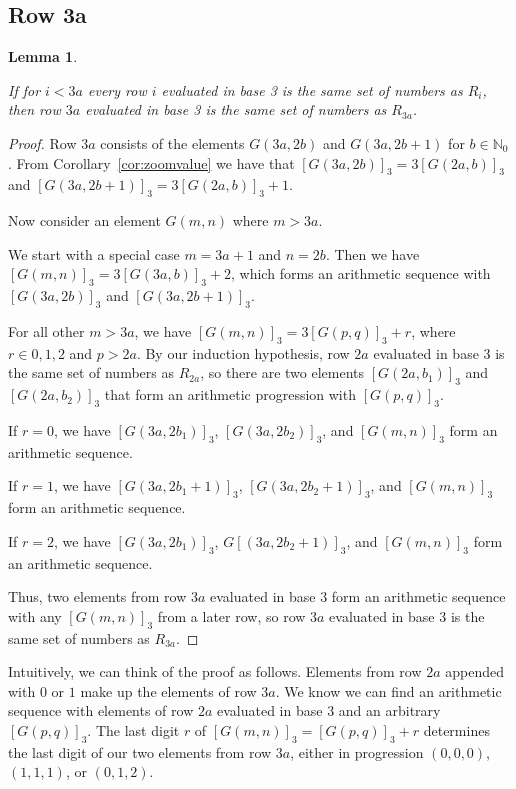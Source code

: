 \documentclass[12pt,reqno]{article}
\theoremstyle{plain}
\newtheorem{lemma}[theorem]{Lemma}
\theoremstyle{definition}
\theoremstyle{remark}
\begin{document}
\subsection{Row 3a}

\begin{lemma}\label{lemma:3a}

If for $i < 3a$ every row $i$ evaluated in base 3 is the same set of numbers as $R_i$, then row $3a$ evaluated in base 3 is the same set of numbers as $R_{3a}$.
\end{lemma}
\begin{proof}
Row $3a$ consists of the elements $G(3a,2b)$ and $G(3a,2b+1)$ for $b \in \mathbb{N}_0$. From Corollary~\ref{cor:zoomvalue} we have that $[G(3a,2b)]_3 = 3[G(2a,b)]_3$ and $[G(3a,2b+1)]_3 = 3[G(2a,b)]_3+1$. 

Now consider an element $G(m,n)$ where $m>3a$. 

We start with a special case $m= 3a+1$ and $n = 2b$. Then we have $[G(m,n)]_3 = 3[G(3a,b)]_3+2$, which forms an arithmetic sequence with $[G(3a,2b)]_3$ and $[G(3a,2b+1)]_3$. 

For all other $m>3a$, we have $[G(m,n)]_3 = 3[G(p,q)]_3 + r$, where $r \in {0,1,2}$ and $p>2a$. By our induction hypothesis, row $2a$ evaluated in base 3 is the same set of numbers as $R_{2a}$, so there are two elements $[G(2a,b_1)]_3$ and $[G(2a,b_2)]_3$ that form an arithmetic progression with $[G(p,q)]_3$.

If $r = 0$, we have $[G(3a,2b_1)]_3$, $[G(3a,2b_2)]_3$, and $[G(m,n)]_3$ form an arithmetic sequence.

If $r = 1$, we have $[G(3a,2b_1+1)]_3$, $[G(3a,2b_2+1)]_3$, and $[G(m,n)]_3$ form an arithmetic sequence.

If $r = 2$, we have $[G(3a,2b_1)]_3$, $G[(3a,2b_2+1)]_3$, and $[G(m,n)]_3$ form an arithmetic sequence.

Thus, two elements from row $3a$ evaluated in base 3 form an arithmetic sequence with any $[G(m,n)]_3$ from a later row, so row $3a$ evaluated in base 3 is the same set of numbers as $R_{3a}$.
\end{proof}

Intuitively, we can think of the proof as follows. Elements from row $2a$ appended with $0$ or $1$ make up the elements of row $3a$. We know we can find an arithmetic sequence with elements of row $2a$ evaluated in base 3 and an arbitrary $[G(p,q)]_3$. The last digit $r$ of $[G(m,n)]_3 = [G(p,q)]_3 + r$ determines the last digit of our two elements from row $3a$, either in progression $(0,0,0)$, $(1,1,1)$, or $(0,1,2)$.
\end{document}
